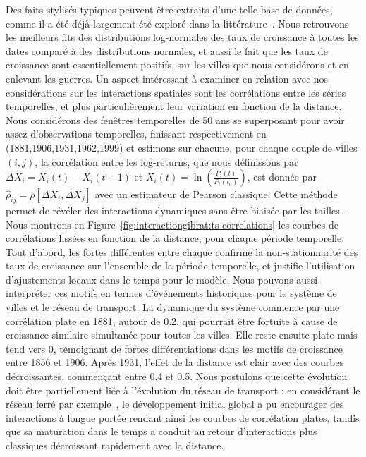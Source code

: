 {Des faits stylisés typiques peuvent être extraits d'une telle base de données, comme il a été déjà largement été exploré dans la littérature~\cite{guerin1990150}. Nous retrouvons les meilleurs fits des distributions log-normales des taux de croissance à toutes les dates comparé à des distributions normales, et aussi le fait que les taux de croissance sont essentiellement positifs, sur les villes que nous considérons et en enlevant les guerres. Un aspect intéressant à examiner en relation avec nos considérations sur les interactions spatiales sont les corrélations entre les séries temporelles, et plus particulièrement leur variation en fonction de la distance. Nous considérons des fenêtres temporelles de 50 ans se superposant pour avoir assez d'observations temporelles, finissant respectivement en (1881,1906,1931,1962,1999) et estimons sur chacune, pour chaque couple de villes $(i,j)$, la corrélation entre les log-returns, que nous définissons par $\Delta X_i = X_i(t) - X_i(t-1)$ et $X_i(t) = \ln\left(\frac{P_i(t)}{P_i(t_0)}\right)$, est donnée par $\hat{\rho}_{ij}=\rho\left[\Delta X_i, \Delta X_j\right]$ avec un estimateur de Pearson classique. Cette méthode permet de révéler des interactions dynamiques sans être biaisée par les tailles~\cite{mantegna1999introduction}. Nous montrons en Figure~\ref{fig:interactiongibrat:ts-correlations} les courbes de corrélations lissées en fonction de la distance, pour chaque période temporelle. Tout d'abord, les fortes différentes entre chaque confirme la non-stationnarité des taux de croissance sur l'ensemble de la période temporelle, et justifie l'utilisation d'ajustements locaux dans le temps pour le modèle. Nous pouvons aussi interpréter ces motifs en termes d'événements historiques pour le système de villes et le réseau de transport. La dynamique du système commence par une corrélation plate en 1881, autour de 0.2, qui pourrait être fortuite à cause de croissance similaire simultanée pour toutes les villes. Elle reste ensuite plate mais tend vers 0, témoignant de fortes différentiations dans les motifs de croissance entre 1856 et 1906. Après 1931, l'effet de la distance est clair avec des courbes décroissantes, commençant entre 0.4 et 0.5. Nous postulons que cette évolution doit être partiellement liée à l'évolution du réseau de transport : en considérant le réseau ferré par exemple~\cite{thevenin2013mapping}, le développement initial global a pu encourager des interactions à longue portée rendant ainsi les courbes de corrélation plates, tandis que sa maturation dans le temps a conduit au retour d'interactions plus classiques décroissant rapidement avec la distance.
}


